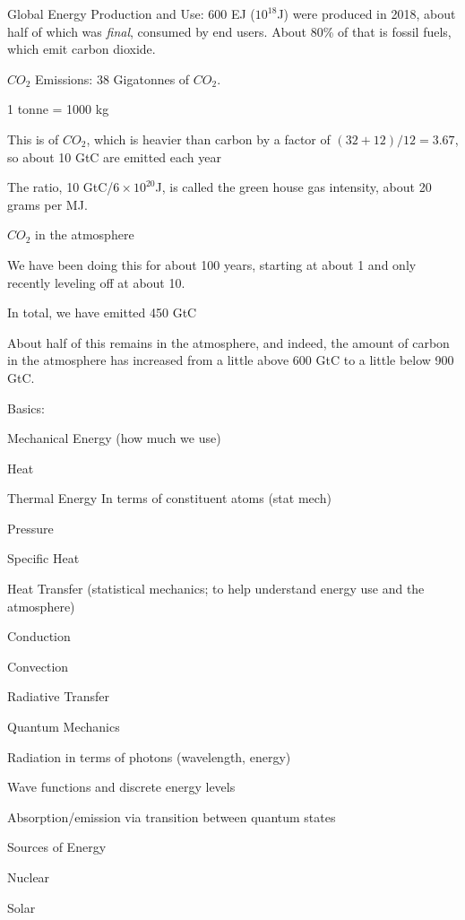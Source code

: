 \documentclass[11pt]{book}
\begin{document}
\bei
\item Global Energy Production and Use: 600 EJ ($10^{18}$J) were produced in 2018, about half of which was {\it final}, consumed by end users. About 80\% of that is fossil fuels, which emit carbon dioxide. 
\item $CO_2$ Emissions: 38 Gigatonnes of $CO_2$. 
\bee
\item 1 tonne = 1000 kg
\item This is of $CO_2$, which is heavier than carbon by a factor of $(32+12)/12=3.67$, so about 10 GtC are emitted each year
\item The ratio, 10 GtC/$6\times 10^{20}$J, is called the green house gas intensity, about 20 grams per MJ.
\eee
\item $CO_2$ in the atmosphere
\bee
\item We have been doing this for about 100 years, starting at about 1 and only recently leveling off at about 10. 
\item In total, we have emitted 450 GtC
\item About half of this remains in the atmosphere, and indeed, the amount of carbon in the atmosphere has increased from a little above 600 GtC to a little below 900 GtC.
\eee
\item Basics:
\bee
\item Mechanical Energy (how much we use)
\item Heat
\bei
\item Thermal Energy In terms of constituent atoms (stat mech)
\item Pressure
\item Specific Heat
\eei
\item Heat Transfer (statistical mechanics; to help understand energy use and the atmosphere)
\bei
\item Conduction
\item Convection
\item Radiative Transfer
\eei
\item Quantum Mechanics 
\bei
\item Radiation in terms of photons (wavelength, energy)
\item Wave functions and discrete energy levels 
\item Absorption/emission via transition between quantum states
\eei 
\eee
\item Sources of Energy
\bee
\item Nuclear
\item Solar
\end{document}
